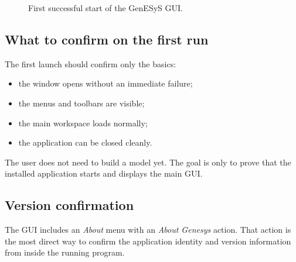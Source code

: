\begin{figure}[htbp]
    \centering



    \caption{First successful start of the GenESyS GUI.}
    \label{fig:user-first-start}
\end{figure}

\subsection{What to confirm on the first run}
\label{subsec:user-installation-first-run-checks}

The first launch should confirm only the basics:
\begin{itemize}
\item the window opens without an immediate failure;
\item the menus and toolbars are visible;
\item the main workspace loads normally;
\item the application can be closed cleanly.
\end{itemize}

The user does not need to build a model yet. The goal is only to prove that the
installed application starts and displays the main GUI.

\subsection{Version confirmation}
\label{subsec:user-installation-version-confirmation}

The GUI includes an \textit{About} menu with an \textit{About Genesys} action.
That action is the most direct way to confirm the application identity and
version information from inside the running program.

